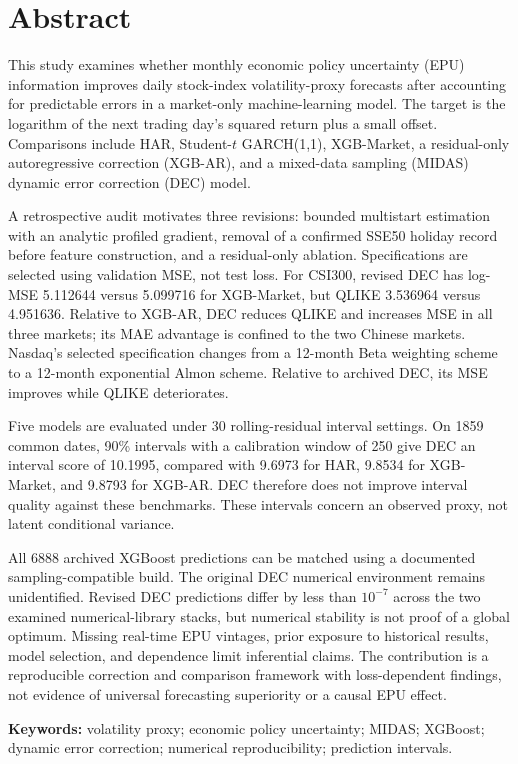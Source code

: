 \section*{Abstract}
This study examines whether monthly economic policy uncertainty (EPU) information improves daily stock-index volatility-proxy forecasts after accounting for predictable errors in a market-only machine-learning model. The target is the logarithm of the next trading day's squared return plus a small offset. Comparisons include HAR, Student-$t$ GARCH(1,1), XGB-Market, a residual-only autoregressive correction (XGB-AR), and a mixed-data sampling (MIDAS) dynamic error correction (DEC) model.

A retrospective audit motivates three revisions: bounded multistart estimation with an analytic profiled gradient, removal of a confirmed SSE50 holiday record before feature construction, and a residual-only ablation. Specifications are selected using validation MSE, not test loss. For CSI300, revised DEC has log-MSE 5.112644 versus 5.099716 for XGB-Market, but QLIKE 3.536964 versus 4.951636. Relative to XGB-AR, DEC reduces QLIKE and increases MSE in all three markets; its MAE advantage is confined to the two Chinese markets. Nasdaq's selected specification changes from a 12-month Beta weighting scheme to a 12-month exponential Almon scheme. Relative to archived DEC, its MSE improves while QLIKE deteriorates.

Five models are evaluated under 30 rolling-residual interval settings. On 1859 common dates, 90\% intervals with a calibration window of 250 give DEC an interval score of 10.1995, compared with 9.6973 for HAR, 9.8534 for XGB-Market, and 9.8793 for XGB-AR. DEC therefore does not improve interval quality against these benchmarks. These intervals concern an observed proxy, not latent conditional variance.

All 6888 archived XGBoost predictions can be matched using a documented sampling-compatible build. The original DEC numerical environment remains unidentified. Revised DEC predictions differ by less than $10^{-7}$ across the two examined numerical-library stacks, but numerical stability is not proof of a global optimum. Missing real-time EPU vintages, prior exposure to historical results, model selection, and dependence limit inferential claims. The contribution is a reproducible correction and comparison framework with loss-dependent findings, not evidence of universal forecasting superiority or a causal EPU effect.

\medskip
\noindent\textbf{Keywords:} volatility proxy; economic policy uncertainty; MIDAS; XGBoost; dynamic error correction; numerical reproducibility; prediction intervals.
\clearpage
